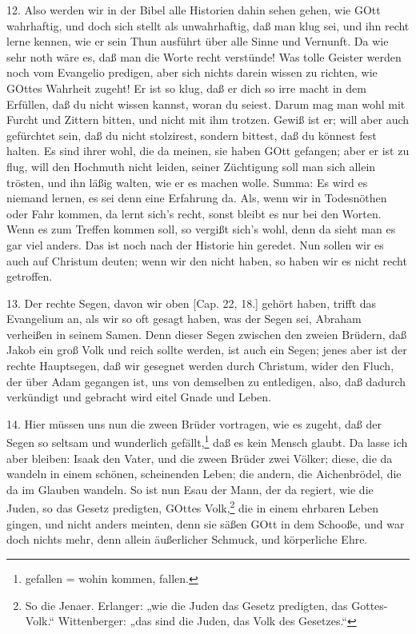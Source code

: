 12. Also werden wir in der Bibel alle Historien dahin sehen gehen, wie GOtt wahrhaftig, und doch sich stellt als unwahrhaftig, daß man klug sei, und ihn recht lerne kennen, wie er sein Thun ausführt über alle Sinne und Vernunft. Da wie sehr noth wäre es, daß man die Worte recht verstünde! Was tolle Geister werden noch vom Evangelio predigen, aber sich nichts darein wissen zu richten, wie GOttes Wahrheit zugeht! Er ist so klug, daß er dich so irre macht in dem Erfüllen, daß du nicht wissen kannst, woran du seiest. Darum mag man wohl mit Furcht und Zittern bitten, und nicht mit ihm trotzen. Gewiß
ist er; will aber auch gefürchtet sein, daß du nicht stolzirest, sondern bittest, daß du könnest fest halten. Es sind ihrer wohl, die da meinen, sie haben GOtt gefangen; aber er ist zu flug, will den Hochmuth nicht leiden, seiner Züchtigung soll man sich allein trösten, und ihn läßig walten, wie er es machen wolle. Summa: Es wird es niemand lernen, es sei denn eine Erfahrung da. Als, wenn wir in Todesnöthen oder Fahr kommen, da lernt sich’s recht, sonst bleibt es nur bei den Worten. Wenn es zum Treffen kommen soll, so vergißt sich’s wohl, denn da sieht man es gar viel anders. Das ist noch nach der Historie hin geredet. Nun sollen wir es auch auf Christum deuten; wenn wir den nicht haben, so haben wir es nicht recht getroffen.

13. Der rechte Segen, davon wir oben [Cap. 22, 18.] gehört haben, trifft das Evangelium an, als wir so oft gesagt haben, was der Segen sei, Abraham verheißen in seinem Samen. Denn dieser Segen zwischen den zweien Brüdern, daß Jakob ein groß Volk und reich sollte werden, ist auch ein Segen; jenes aber ist der rechte Hauptsegen, daß wir gesegnet werden durch Christum, wider den Fluch, der über Adam gegangen ist, uns von demselben zu entledigen, also, daß dadurch verkündigt und gebracht wird eitel Gnade und Leben.

14. Hier müssen uns nun die zween Brüder vortragen, wie es zugeht, daß der Segen so seltsam und wunderlich gefällt,\footnote{gefallen = wohin kommen, fallen.} daß es kein Mensch glaubt. Da lasse ich aber bleiben: Isaak den Vater, und die zween Brüder zwei Völker; diese, die da wandeln in einem schönen, scheinenden Leben; die andern, die Aichenbrödel, die da im Glauben wandeln. So ist nun Esau der Mann, der da regiert, wie die Juden, so das Gesetz predigten, GOttes Volk,\footnote{So die Jenaer. Erlanger: „wie die Juden das Gesetz predigten, das Gottes-Volk.“ Wittenberger: „das sind die Juden, das Volk des Gesetzes.“} die in einem ehrbaren Leben gingen, und nicht anders meinten, denn sie säßen GOtt in dem Schooße, und war doch nichts mehr, denn allein äußerlicher Schmuck, und körperliche Ehre.

